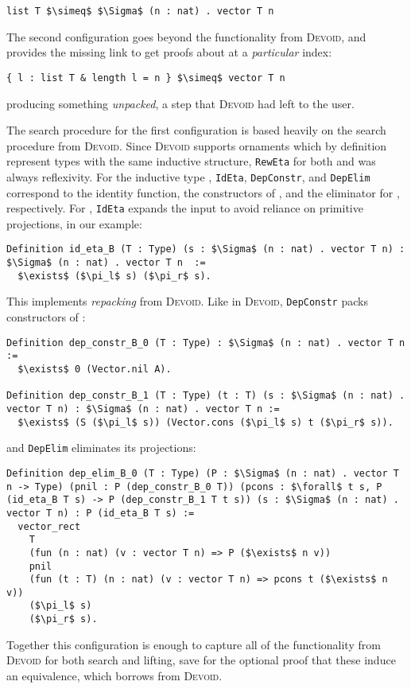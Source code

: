 \begin{lstlisting}
list T $\simeq$ $\Sigma$ (n : nat) . vector T n
\end{lstlisting}
The second configuration goes beyond the functionality from \textsc{Devoid}, and provides
the missing link to get proofs about \B at a \textit{particular} index:

\begin{lstlisting}
{ l : list T & length l = n } $\simeq$ vector T n
\end{lstlisting}
producing something \textit{unpacked},
a step that \textsc{Devoid} had left to the user.

The search procedure for the first configuration is based heavily on the search procedure from \textsc{Devoid}.
Since \textsc{Devoid} supports ornaments which by definition represent types with the same inductive structure,
\lstinline{RewEta} for both \A and \B was always reflexivity.
For the inductive type \A, \lstinline{IdEta}, \lstinline{DepConstr}, and \lstinline{DepElim}
correspond to the identity function, the constructors of \A, and the eliminator for \A, respectively.
For \B, \lstinline{IdEta} expands the input to avoid reliance on primitive projections,
in our example:

\begin{lstlisting}
Definition id_eta_B (T : Type) (s : $\Sigma$ (n : nat) . vector T n) : $\Sigma$ (n : nat) . vector T n  :=
  $\exists$ ($\pi_l$ s) ($\pi_r$ s).
\end{lstlisting}
This implements \textit{repacking} from \textsc{Devoid}.
Like in \textsc{Devoid},
\lstinline{DepConstr} packs constructors of \B:

\begin{lstlisting}
Definition dep_constr_B_0 (T : Type) : $\Sigma$ (n : nat) . vector T n :=
  $\exists$ 0 (Vector.nil A).

Definition dep_constr_B_1 (T : Type) (t : T) (s : $\Sigma$ (n : nat) . vector T n) : $\Sigma$ (n : nat) . vector T n :=
  $\exists$ (S ($\pi_l$ s)) (Vector.cons ($\pi_l$ s) t ($\pi_r$ s)).
\end{lstlisting}
and \lstinline{DepElim} eliminates its projections:

\begin{lstlisting}
Definition dep_elim_B_0 (T : Type) (P : $\Sigma$ (n : nat) . vector T n -> Type) (pnil : P (dep_constr_B_0 T)) (pcons : $\forall$ t s, P (id_eta_B T s) -> P (dep_constr_B_1 T t s)) (s : $\Sigma$ (n : nat) . vector T n) : P (id_eta_B T s) :=
  vector_rect
    T
    (fun (n : nat) (v : vector T n) => P ($\exists$ n v))
    pnil
    (fun (t : T) (n : nat) (v : vector T n) => pcons t ($\exists$ n v))
    ($\pi_l$ s)
    ($\pi_r$ s).
\end{lstlisting}
Together this configuration is enough to capture all of the functionality from \textsc{Devoid} for both search and lifting,
save for the optional proof that these induce an equivalence, which \toolname borrows from \textsc{Devoid}.

